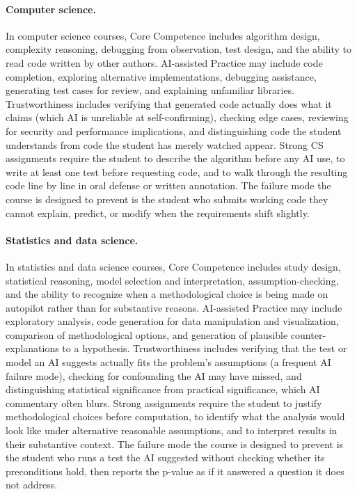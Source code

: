 \documentclass{SIAMbook2023}
\begin{document}
\paragraph{Computer science.} In computer science courses, Core Competence includes algorithm design, complexity reasoning, debugging from observation, test design, and the ability to read code written by other authors. AI-assisted Practice may include code completion, exploring alternative implementations, debugging assistance, generating test cases for review, and explaining unfamiliar libraries. Trustworthiness includes verifying that generated code actually does what it claims (which AI is unreliable at self-confirming), checking edge cases, reviewing for security and performance implications, and distinguishing code the student understands from code the student has merely watched appear. Strong CS assignments require the student to describe the algorithm before any AI use, to write at least one test before requesting code, and to walk through the resulting code line by line in oral defense or written annotation. The failure mode the course is designed to prevent is the student who submits working code they cannot explain, predict, or modify when the requirements shift slightly.

\paragraph{Statistics and data science.} In statistics and data science courses, Core Competence includes study design, statistical reasoning, model selection and interpretation, assumption-checking, and the ability to recognize when a methodological choice is being made on autopilot rather than for substantive reasons. AI-assisted Practice may include exploratory analysis, code generation for data manipulation and visualization, comparison of methodological options, and generation of plausible counter-explanations to a hypothesis. Trustworthiness includes verifying that the test or model an AI suggests actually fits the problem's assumptions (a frequent AI failure mode), checking for confounding the AI may have missed, and distinguishing statistical significance from practical significance, which AI commentary often blurs. Strong assignments require the student to justify methodological choices before computation, to identify what the analysis would look like under alternative reasonable assumptions, and to interpret results in their substantive context. The failure mode the course is designed to prevent is the student who runs a test the AI suggested without checking whether its preconditions hold, then reports the p-value as if it answered a question it does not address.
\end{document}
